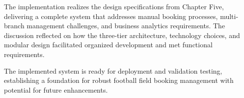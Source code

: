The implementation realizes the design specifications from Chapter Five, delivering a complete system that addresses manual booking processes, multi-branch management challenges, and business analytics requirements. The discussion reflected on how the three-tier architecture, technology choices, and modular design facilitated organized development and met functional requirements.

The implemented system is ready for deployment and validation testing, establishing a foundation for robust football field booking management with potential for future enhancements.
